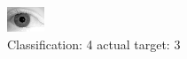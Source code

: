 \begin{figure}[h!]
\begin{center}
\includegraphics[width=0.60\columnwidth]{figures/ID2118_class_4_target_3.png}
\end{center}
\caption{ Classification: 4 actual target: 3}
\label{fig:ID2118_class_4_target_3}
\end{figure}
